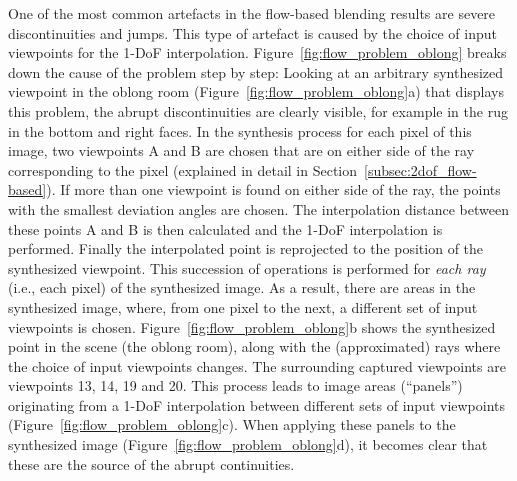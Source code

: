 One of the most common artefacts in the flow-based blending results are severe discontinuities and jumps. This type of artefact is caused by the choice of input viewpoints for the 1-DoF interpolation. Figure~\ref{fig:flow_problem_oblong} breaks down the cause of the problem step by step: Looking at an arbitrary synthesized viewpoint in the oblong room (Figure~\ref{fig:flow_problem_oblong}a) that displays this problem, the abrupt discontinuities are clearly visible, for example in the rug in the bottom and right faces.
In the synthesis process for each pixel of this image, two viewpoints A and B are chosen that are on either side of the ray corresponding to the pixel (explained in detail in Section~\ref{subsec:2dof_flow-based}). If more than one viewpoint is found on either side of the ray, the points with the smallest deviation angles are chosen. The interpolation distance between these points A and B is then calculated and the 1-DoF interpolation is performed. Finally the interpolated point is reprojected to the position of the synthesized viewpoint.
This succession of operations is performed for \emph{each ray} (i.e., each pixel) of the synthesized image. As a result, there are areas in the synthesized image, where, from one pixel to the next, a different set of input viewpoints is chosen.
Figure~\ref{fig:flow_problem_oblong}b shows the synthesized point in the scene (the oblong room), along with the (approximated) rays where the choice of input viewpoints changes. The surrounding captured viewpoints are viewpoints 13, 14, 19 and 20.
This process leads to image areas (``panels'') originating from a 1-DoF interpolation between different sets of input viewpoints (Figure~\ref{fig:flow_problem_oblong}c). When applying these panels to the synthesized image (Figure~\ref{fig:flow_problem_oblong}d), it becomes clear that these are the source of the abrupt continuities.

